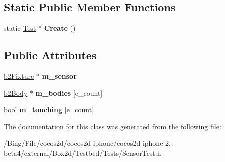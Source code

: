 \subsection*{Static Public Member Functions}
\begin{DoxyCompactItemize}
\item 
\hypertarget{class_sensor_test_a69afb622f4be76a479ab78ae3adf0e39}{static \hyperlink{class_test}{Test} $\ast$ {\bfseries Create} ()}\label{class_sensor_test_a69afb622f4be76a479ab78ae3adf0e39}

\end{DoxyCompactItemize}
\subsection*{Public Attributes}
\begin{DoxyCompactItemize}
\item 
\hypertarget{class_sensor_test_a5424e6071586aae3194c4e5584ba5cbc}{\hyperlink{classb2_fixture}{b2\-Fixture} $\ast$ {\bfseries m\-\_\-sensor}}\label{class_sensor_test_a5424e6071586aae3194c4e5584ba5cbc}

\item 
\hypertarget{class_sensor_test_abad79549bd11156d1878674e49d51659}{\hyperlink{classb2_body}{b2\-Body} $\ast$ {\bfseries m\-\_\-bodies} \mbox{[}e\-\_\-count\mbox{]}}\label{class_sensor_test_abad79549bd11156d1878674e49d51659}

\item 
\hypertarget{class_sensor_test_a3ecb802d92e094cd129121780678b668}{bool {\bfseries m\-\_\-touching} \mbox{[}e\-\_\-count\mbox{]}}\label{class_sensor_test_a3ecb802d92e094cd129121780678b668}

\end{DoxyCompactItemize}


The documentation for this class was generated from the following file\-:\begin{DoxyCompactItemize}
\item 
/\-Bing/\-File/cocos2d/cocos2d-\/iphone/cocos2d-\/iphone-\/2.-\/beta4/external/\-Box2d/\-Testbed/\-Tests/Sensor\-Test.\-h\end{DoxyCompactItemize}
